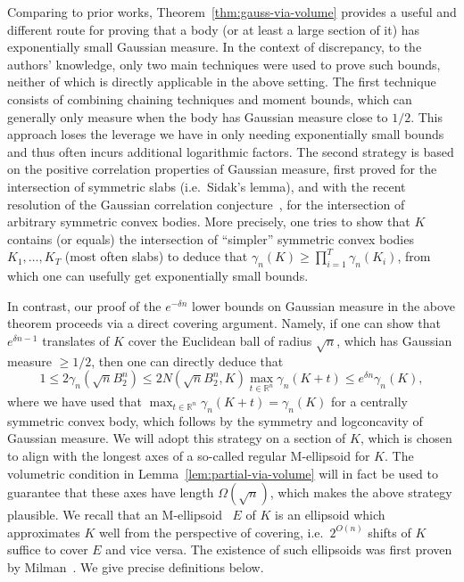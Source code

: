 \documentclass[11pt]{article}
\newcommand{\R}{{\mathbb{R}}}
\begin{document}
Comparing to prior works, Theorem~\ref{thm:gauss-via-volume} provides a useful
and different route for proving that a body (or at least a large section of it)
has exponentially small Gaussian measure. In the context of discrepancy, to the
authors' knowledge, only two main techniques were used to prove such bounds,
neither of which is directly applicable in the above setting. The first
technique consists of combining chaining techniques and moment bounds, which can
generally only measure when the body has Gaussian measure close to $1/2$.  This
approach loses the leverage we have in only needing exponentially small bounds
and thus often incurs additional logarithmic factors. The second strategy is
based on the positive correlation properties of Gaussian measure, first proved
for the intersection of symmetric slabs (i.e.~Sidak's lemma), and with the
recent resolution of the Gaussian correlation conjecture~\cite{Royen14}, for the
intersection of arbitrary symmetric convex bodies. More precisely, one tries to
show that $K$ contains (or equals) the intersection of ``simpler'' symmetric
convex bodies $K_1,\dots,K_T$ (most often slabs) to deduce that $\gamma_n(K)
\geq \prod_{i=1}^T \gamma_n(K_i)$, from which one can usefully get exponentially
small bounds.

In contrast, our proof of the $e^{-\delta n}$ lower bounds on Gaussian measure
in the above theorem proceeds via a direct covering argument. Namely, if one can
show that $e^{\delta n-1}$ translates of $K$ cover the Euclidean ball of radius
$\sqrt{n}$, which has Gaussian measure $\geq 1/2$, then one can directly deduce
that 
\[
1 \leq 2\gamma_n(\sqrt{n}B_2^n) \leq 2N(\sqrt{n} B_2^n,K) \max_{t \in \R^n}
\gamma_n(K+t) \leq e^{\delta n} \gamma_n(K) ,
\]
where we have used that $\max_{t \in \R^n} \gamma_n(K+t) = \gamma_n(K)$ for a
centrally symmetric convex body, which follows by the symmetry and logconcavity
of Gaussian measure. We will adopt this strategy on a section of $K$, which is
chosen to align with the longest axes of a so-called regular M-ellipsoid for
$K$. The volumetric condition in Lemma~\ref{lem:partial-via-volume} will in fact
be used to guarantee that these axes have length $\Omega(\sqrt{n})$, which makes
the above strategy plausible. We recall that an M-ellipsoid~ $E$ of $K$ is an
ellipsoid which approximates $K$ well from the perspective of covering,
i.e.~$2^{O(n)}$ shifts of $K$ suffice to cover $E$ and vice versa. The existence
of such ellipsoids was first proven by Milman~\cite{Milman86-reverseBM}. We give
precise definitions below. 
\end{document}
